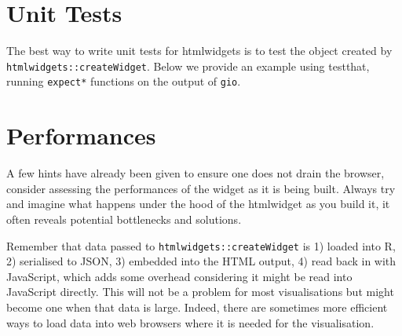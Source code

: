 \documentclass[
]{krantz}
\makeatletter
\newenvironment{Shaded}{\begin{snugshade}}{\end{snugshade}}
\newcommand{\CommentTok}[1]{\textcolor[rgb]{0.37,0.37,0.37}{\textit{#1}}}
\newcommand{\KeywordTok}[1]{\textcolor[rgb]{0.27,0.27,0.27}{\textbf{#1}}}
\newcommand{\NormalTok}[1]{#1}
\newcommand{\OperatorTok}[1]{\textcolor[rgb]{0.43,0.43,0.43}{\textbf{#1}}}
\newcommand{\StringTok}[1]{\textcolor[rgb]{0.5,0.5,0.5}{#1}}
\newenvironment{kframe}{%
\medskip{}
\setlength{\fboxsep}{.8em}
 \def\at@end@of@kframe{}%
 \ifinner\ifhmode%
  \def\at@end@of@kframe{\end{minipage}}%
  \begin{minipage}{\columnwidth}%
 \fi\fi%
 \def\FrameCommand##1{\hskip\@totalleftmargin \hskip-\fboxsep
 \colorbox{shadecolor}{##1}\hskip-\fboxsep
     \hskip-\linewidth \hskip-\@totalleftmargin \hskip\columnwidth}%
 \MakeFramed {\advance\hsize-\width
   \@totalleftmargin\z@ \linewidth\hsize
   \@setminipage}}%
 {\par\unskip\endMakeFramed%
 \at@end@of@kframe}
\renewenvironment{Shaded}{\begin{kframe}}{\end{kframe}}
\makeatother
\begin{document}
\hypertarget{widgets-adv-unit-tests}{%
\section{Unit Tests}\label{widgets-adv-unit-tests}}

The best way to write unit tests for htmlwidgets is to test the object created by \texttt{htmlwidgets::createWidget}. Below we provide an example using testthat\citep{R-testthat}, running \texttt{expect*} functions on the output of \texttt{gio}.

\begin{Shaded}
\end{Shaded}

\hypertarget{widgets-adv-performances}{%
\section{Performances}\label{widgets-adv-performances}}

A few hints have already been given to ensure one does not drain the browser, consider assessing the performances of the widget as it is being built. Always try and imagine what happens under the hood of the htmlwidget as you build it, it often reveals potential bottlenecks and solutions.

Remember that data passed to \texttt{htmlwidgets::createWidget} is 1) loaded into R, 2) serialised to JSON, 3) embedded into the HTML output, 4) read back in with JavaScript, which adds some overhead considering it might be read into JavaScript directly. This will not be a problem for most visualisations but might become one when that data is large. Indeed, there are sometimes more efficient ways to load data into web browsers where it is needed for the visualisation.
\end{document}
